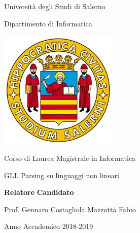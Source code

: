 \begin{titlepage}
\begin{center}
	{\LARGE Università degli Studi di Salerno}\par
	\vspace{0.5cm}
	{\Large Dipartimento di Informatica}\par
	\vspace{1cm}
	\includegraphics[height=160pt]{logounisa.png}\par
	\vspace{1cm}
	{\Large Corso di Laurea Magistrale in Informatica}\par
	\vspace{2cm}
	{\Huge GLL Parsing su linguaggi non lineari}\par
	\vspace{2cm}
\end{center}
\begin{flushleft}
	{\large\textbf{Relatore}}
	\hspace{8cm}
	{\large\textbf{Candidato}}\par
	\vspace{0.1cm}
	{\large Prof. Gennaro Costagliola}
	\hspace{4.5cm}
	{\large Mazzotta Fabio}%
\end{flushleft}	
	\vspace{3.5cm}
\begin{center}
	{\large Anno Accademico 2018-2019}
\end{center}
\end{titlepage}